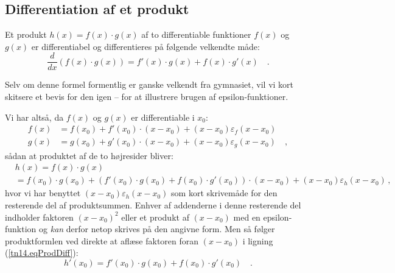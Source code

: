 

\subsection{Differentiation af et produkt}
\begin{theorem}
Et produkt $h(x) = f(x) \cdot g(x)$ af  to differentiable funktioner $f(x)$ og $g(x)$ er differentiabel og differentieres på følgende velkendte måde:
\begin{equation}
\frac{d}{dx}\left(f(x)\cdot g(x)\right) = f'(x)\cdot g(x) + f(x)\cdot g'(x) \quad .
\end{equation}
\end{theorem}

Selv om denne formel formentlig er ganske velkendt fra gymnasiet, vil vi kort skitsere et bevis for den igen -- for at illustrere brugen af epsilon-funktioner.
\begin{bevis}
Vi har altså, da $f(x)$ og $g(x)$ er differentiable i $x_{0}$:
\begin{equation}
\begin{aligned}
f(x) &= f(x_{0}) + f'(x_{0})\cdot (x - x_{0}) + (x - x_{0})\varepsilon_{f}(x-x_{0}) \\
g(x) &= g(x_{0}) + g'(x_{0})\cdot (x - x_{0}) + (x - x_{0})\varepsilon_{g}(x-x_{0}) \quad,
\end{aligned}
\end{equation}
sådan at produktet af de to højresider bliver:
\begin{equation} \label{tn14.eqProdDiff}
\begin{aligned}
&h(x) = f(x)\cdot g(x) \\
&= f(x_{0})\cdot g(x_{0}) + (f'(x_{0})\cdot g(x_{0}) + f(x_{0})\cdot g'(x_{0})) \cdot(x - x_{0}) + (x - x_{0})\varepsilon_{h}(x- x_{0}) \, ,
\end{aligned}
\end{equation}
hvor vi har benyttet $(x-x_{0})\varepsilon_{h}(x- x_{0})$ som kort skrivemåde for den resterende del af produktsummen. Enhver af addenderne i denne resterende
del indholder faktoren $(x - x_{0})^{2}$ eller et produkt af $(x-x_{0})$ med en epsilon-funktion og \emph{kan} derfor netop skrives på den angivne form.
Men så følger produktformlen ved direkte at aflæse faktoren foran $(x - x_{0})$ i ligning (\ref{tn14.eqProdDiff}):
\begin{equation}
h'(x_{0}) = f'(x_{0})\cdot g(x_{0}) + f(x_{0})\cdot g'(x_{0}) \quad.
\end{equation}
\end{bevis}



